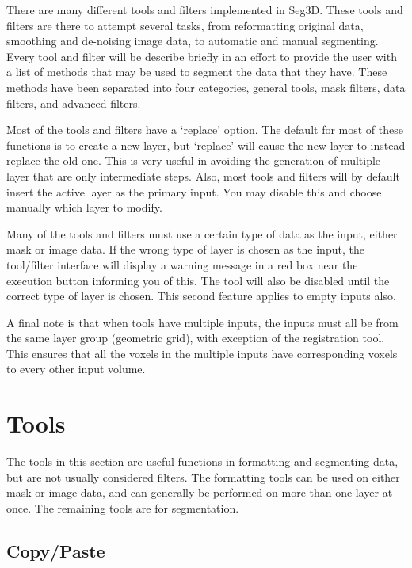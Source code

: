 \documentclass[fleqn,11pt,openany]{book}
\begin{document}
\begin{introduction}
 There are many different tools and filters implemented in Seg3D.  These tools and filters are there to attempt several tasks, from reformatting original data, smoothing and de-noising image data, to automatic and manual segmenting.  Every tool and filter will be describe briefly in an effort to provide the user with a list of methods that may be used to segment the data that they have.  These methods have been separated into four categories, general tools, mask filters, data filters, and advanced filters.
 
Most of the tools and filters have a `replace' option.  The default for most of these functions is to create a new layer, but `replace' will cause the new layer to instead replace the old one.  This is very useful in avoiding the generation of multiple layer that are only intermediate steps.  Also, most tools and filters will by default insert the active layer as the primary input.  You may disable this and choose manually which layer to modify.  

 Many of the tools and filters must use a certain type of data as the input, either mask or image data.  If the wrong type of layer is chosen as the input, the tool/filter interface will display a warning message in a red box near the execution button informing you of this.  The tool will also be disabled until the correct type of layer is chosen.  This second feature applies to empty inputs also.  

 A final note is that when tools have multiple inputs, the inputs must all be from the same layer group (geometric grid), with exception of the registration tool.  This ensures that all the voxels in the multiple inputs have corresponding voxels to every other input volume. 

\end{introduction}

\section{Tools}

The tools in this section are useful functions in formatting and segmenting data, but are not usually considered filters.  The formatting tools can be used on either mask or image data, and can generally be performed on more than one layer at once.  The remaining tools are for segmentation.  

\subsection{Copy/Paste}
\end{document}
